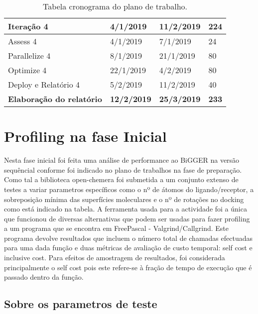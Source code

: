 \begin{table}[]
\begin{tabular}{|l|l|l|l|}
\textbf{Iteração 4}              & \textbf{4/1/2019}   & \textbf{11/2/2019}  & \textbf{224}              \\ \hline
Assess 4                         & 4/1/2019            & 7/1/2019            & 24                        \\ \hline
Parallelize 4                    & 8/1/2019            & 21/1/2019           & 80                        \\ \hline
Optimize 4                       & 22/1/2019           & 4/2/2019            & 80                        \\ \hline
Deploy e Relatório 4             & 5/2/2019            & 11/2/2019           & 40                        \\ \hline
\textbf{Elaboração do relatório} & \textbf{12/2/2019}  & \textbf{25/3/2019}  & \textbf{233}              \\ \hline
\end{tabular}
\caption{Tabela cronograma do plano de trabalho.}
\label{tabPlano}
\end{table}

\section{Profiling na fase Inicial}
Nesta fase inicial foi feita uma análise de performance ao BiGGER na versão sequêncial conforme foi indicado no plano de trabalhos na fase de preparação. Como tal a biblioteca open-chemera foi submetida a um conjunto extenso de testes a variar parametros específicos como o nº de átomos do ligando/receptor, a sobreposição mínima das superfícies moleculares e o nº de rotações no docking como está indicado na tabela. A ferramenta usada para a actividade foi a única que funcionou de diversas alternativas que podem ser usadas para fazer profiling a um programa que se encontra em FreePascal - Valgrind/Callgrind. Este programa devolve resultados que incluem o número total de chamadas efectuadas para uma dada função e duas métricas de avaliação de custo temporal: self cost e inclusive cost. Para efeitos de amostragem de resultados, foi considerada principalmente o self cost pois este refere-se à fração de tempo de execução que é passado dentro da função.
\subsection{Sobre os parametros de teste}
